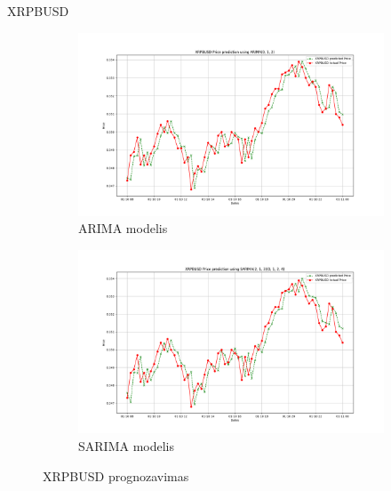 \documentclass{VUMIFInfKursinis}
\begin{document}
XRPBUSD
\begin{figure}[H]
  \centering
  \begin{subfigure}{.5\textwidth}
    \centering
    \includegraphics[width=\linewidth]{img/XRPBUSD__ARIMA(0, 1, 2).png}
    \caption{ARIMA modelis}
    \label{fig:xrpbusd_arima}
  \end{subfigure}%
  \begin{subfigure}{.5\textwidth}
    \centering
    \includegraphics[width=\linewidth]{img/XRPBUSD_seasonal_ARIMA(2, 1, 3)(0, 1, 2, 4).png}
    \caption{SARIMA modelis}
    \label{fig:xrpbusd_sarima}
  \end{subfigure}
  \caption{XRPBUSD prognozavimas}
  \label{fig:xrpbusd}
\end{figure}

\vspace{20pt}
\end{document}
